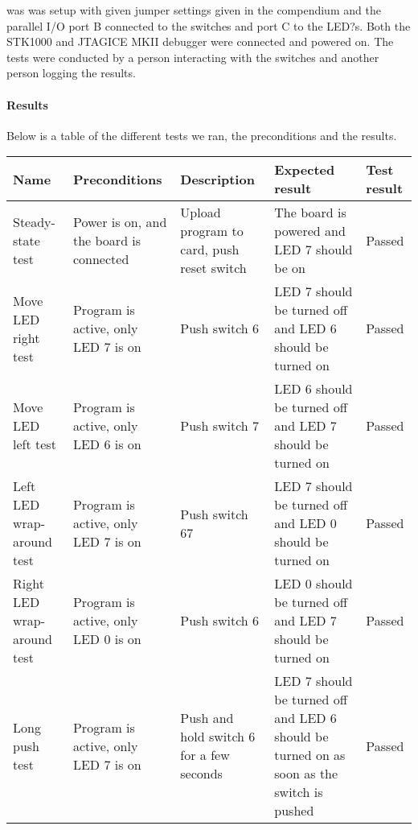 \documentclass[a4paper,11pt]{article}
\begin{document}
 was was setup with given jumper settings given in the compendium and the parallel I/O port B connected to the switches and port C to the LED?s. Both the STK1000 and JTAGICE MKII debugger were connected and powered on. The tests were conducted by a person interacting with the switches and another person logging the results.


\paragraph{Results}
Below is a table of the different tests we ran, the preconditions and the results.
\linebreak

\renewcommand{\arraystretch}{1.25} %
\begin{tabular}[pos]{|m{70pt}|m{90pt}|m{90pt}|m{100pt}|m{60pt}|}
\hline
\textbf{Name} 				& \textbf{Preconditions}				& \textbf{Description} 					& \textbf{Expected result} 													& \textbf{Test result} 		\\ \hline

Steady-state test			& Power is on, and the board is connected & Upload program to card, push reset switch 	& The board is powered and LED 7 should be on 									& Passed 				\\ \hline

Move LED right test			& Program is active, only LED 7 is on 		& Push switch 6						 	& LED 7 should be turned off and LED 6 should be turned on 							& Passed 				\\ \hline

Move LED left test			& Program is active, only LED 6 is on 		& Push switch 7						 	& LED 6 should be turned off and LED 7 should be turned on 							& Passed 				\\ \hline

Left LED wrap-around test		& Program is active, only LED 7 is on 		& Push switch 67					 	& LED 7 should be turned off and LED 0 should be turned on 							& Passed 				\\ \hline

Right LED wrap-around test	& Program is active, only LED 0 is on 		& Push switch 6						 	& LED 0 should be turned off and LED 7 should be turned on 							& Passed 				\\ \hline

Long push test				& Program is active, only LED 7 is on 		& Push and hold switch 6 for a few seconds 	& LED 7 should be turned off and LED 6 should be turned on as soon as the switch is pushed 	& Passed 				\\ \hline
\end{tabular}
\end{document}
